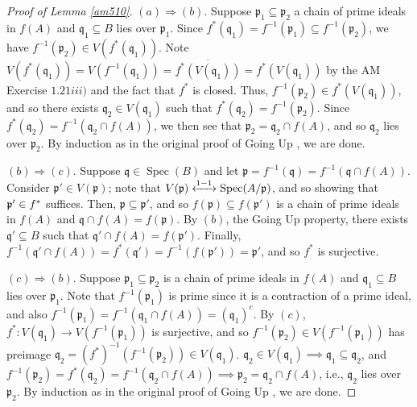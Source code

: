 \documentclass[12pt,letterpaper]{article}
\theoremstyle{definition}
\theoremstyle{remark}
\numberwithin{equation}{section}
\numberwithin{figure}{problem}
\let\Im\relax
\DeclareMathOperator{\Im}{im}
\DeclareMathOperator{\Spec}{Spec}
\begin{document}
\begin{proof}[Proof of Lemma \ref{am510}]
  $(a) \Rightarrow (b)$. Suppose $\mathfrak{p}_1 \subseteq \mathfrak{p}_2$ a chain of prime ideals in $f(A)$ and $\mathfrak{q}_1 \subseteq B$ lies over $\mathfrak{p}_1$. Since $f^*(\mathfrak{q}_1) = f^{-1}(\mathfrak{p}_1) \subseteq f^{-1}(\mathfrak{p}_2)$, we have $f^{-1}(\mathfrak{p}_2) \in V(f^*(\mathfrak{q}_1))$. Note $V(f^*(\mathfrak{q}_1)) = V(f^{-1}(\mathfrak{q}_1)) = \overline{f^*(V(\mathfrak{q}_1))} = f^*(V(\mathfrak{q}_1))$ by the AM Exercise $1.21iii)$ and the fact that $f^*$ is closed. Thus, $f^{-1}(\mathfrak{p}_2) \in f^*(V(\mathfrak{q}_1))$, and so there exists $\mathfrak{q}_2 \in V(\mathfrak{q}_1)$ such that $f^*(\mathfrak{q}_2) = f^{-1}(\mathfrak{p}_2)$. Since $f^*(\mathfrak{q}_2) = f^{-1}(\mathfrak{q}_2 \cap f(A))$, we then see that $\mathfrak{p}_2 = \mathfrak{q}_2 \cap f(A)$, and so $\mathfrak{q}_2$ lies over $\mathfrak{p}_2$. By induction as in the original proof of Going Up \cite[Thm.~5.11]{AM69}, we are done.
  \par $(b) \Rightarrow (c)$. Suppose $\mathfrak{q} \in \Spec(B)$ and let $\mathfrak{p} = f^{-1}(\mathfrak{q}) = f^{-1}(\mathfrak{q} \cap f(A))$. Consider $\mathfrak{p}' \in V(\mathfrak{p})$; note that $V(\mathfrak{p}) \xleftrightarrow{1-1\:} \Spec(A/\mathfrak{p})$, and so showing that $\mathfrak{p}' \in \Im f^*$ suffices. Then, $\mathfrak{p} \subseteq \mathfrak{p}'$, and so $f(\mathfrak{p}) \subseteq f(\mathfrak{p}')$ is a chain of prime ideals in $f(A)$ and $\mathfrak{q} \cap f(A) = f(\mathfrak{p})$. By $(b)$, the Going Up property, there exists $\mathfrak{q}' \subseteq B$ such that $\mathfrak{q}' \cap f(A) = f(\mathfrak{p}')$. Finally, $f^{-1}(\mathfrak{q}' \cap f(A)) = f^*(\mathfrak{q}') = f^{-1}(f(\mathfrak{p}')) = \mathfrak{p}'$, and so $f^*$ is surjective.
  \par $(c) \Rightarrow (b)$. Suppose $\mathfrak{p}_1 \subseteq \mathfrak{p}_2$ is a chain of prime ideals in $f(A)$ and $\mathfrak{q}_1 \subseteq B$ lies over $\mathfrak{p}_1$. Note that $f^{-1}(\mathfrak{p}_1)$ is prime since it is a contraction of a prime ideal, and also $f^{-1}(\mathfrak{p}_1) = f^{-1}(\mathfrak{q}_1 \cap f(A)) = (\mathfrak{q}_1)^c$. By $(c)$, $f^*\colon V(\mathfrak{q}_1) \to V(f^{-1}(\mathfrak{p}_1))$ is surjective, and so $f^{-1}(\mathfrak{p}_2) \in V(f^{-1}(\mathfrak{p}_1))$ has preimage $\mathfrak{q}_2 = (f^*)^{-1}(f^{-1}(\mathfrak{p}_2)) \in V(\mathfrak{q}_1)$. $\mathfrak{q}_2 \in V(\mathfrak{q}_1) \implies \mathfrak{q}_1 \subseteq \mathfrak{q}_2$, and $f^{-1}(\mathfrak{p}_2) = f^*(\mathfrak{q}_2) = f^{-1}(\mathfrak{q}_2 \cap f(A)) \implies \mathfrak{p}_2 = \mathfrak{q}_2 \cap f(A)$, i.e., $\mathfrak{q}_2$ lies over $\mathfrak{p}_2$. By induction as in the original proof of Going Up \cite[Thm.~5.11]{AM69}, we are done.
\end{proof}
\end{document}

